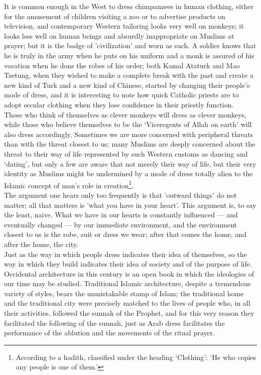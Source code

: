 \documentclass[10pt, twoside,openright]{book}
\begin{document}
It is common enough in the West to dress chimpanzees in human clothing, either for the amusement of 
children visiting a zoo or to advertise products on television, and contemporary Western tailoring 
looks very well on monkeys; it looks less well on human beings and absurdly inappropriate on Muslims 
at prayer; but it is the badge of 'civilization' and worn as such. A soldier knows that he is truly 
in the army when he puts on his uniform and a monk is assured of his vocation when he dons the robes 
of his order; both Kamal Ataturk and Mao Tzetung, when they wished to make a complete break with the 
past and create a new kind of Turk and a new kind of Chinese, started by changing their people's mode 
of dress, and it is interesting to note how quick Catholic priests are to adopt secular clothing when 
they lose confidence in their priestly function. \\

Those who think of themselves as clever monkeys will dress as clever monkeys, while those who believe 
themselves to be the `Viceregents of Allah on earth' will also dress accordingly. Sometimes we are 
more concerned with peripheral threats than with the threat closest to us; many Muslims are deeply 
concerned about the threat to their way of life represented by such Western customs as dancing and 
`dating', but only a few are aware that not merely their way of life, but their very identity as 
Muslims might be undermined by a mode of dress totally alien to the Islamic concept of man's role in 
creation\footnote{According to a hadith, classified under the heading `Clothing': `He who copies any people is one of them.'}. \\

The argument one hears only too frequently is that 'outward things' do not matter; all that matters 
is 'what you have in your heart'. This argument is, to say the least, naive. What we have in our 
hearts is constantly influenced --- and eventually changed --- by our immediate environment, and the 
environment closest to us is the robe, suit or dress we wear; after that comes the home, and after 
the home, the city. \\

Just as the way in which people dress indicates their idea of themselves, so the way in which they 
build indicates their idea of society and of the purpose of life. Occidental architecture in this 
century is an open book in which the ideologies of our time may be studied. Traditional Islamic 
architecture, despite a tremendous variety of styles, bears the unmistakable stamp of Islam; the 
traditional home and the traditional city were precisely matched to the lives of people who, in all 
their activities, followed the sunnah of the Prophet, and for this very reason they facilitated the 
following of the sunnah, just as Arab dress facilitates the performance of the ablution and the 
movements of the ritual prayer. \\
\end{document}
